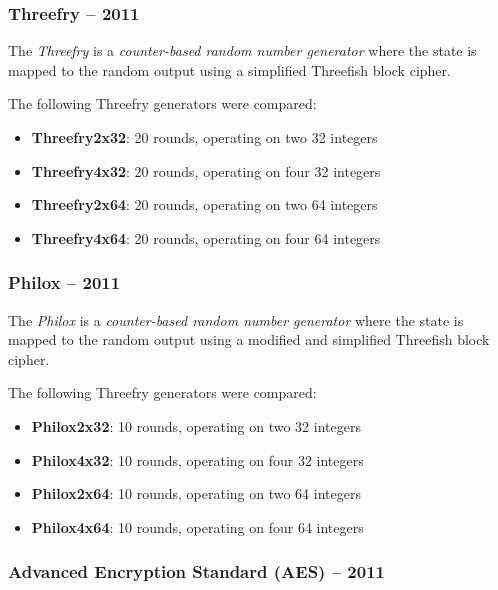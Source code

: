 \subsubsection[Threefry -- 2011]{Threefry -- 2011} \label{subsubsec:threefry}

    The \emph{Threefry} is a \emph{counter-based random number generator} where the state is mapped to the random output using a simplified Threefish block cipher.

    The following Threefry generators were compared:
    \begin{itemize}
		\itemsep0em
        \item \textbf{Threefry2x32}: 20 rounds, operating on two  \SI{32}{\bit} integers
        \item \textbf{Threefry4x32}: 20 rounds, operating on four \SI{32}{\bit} integers
        \item \textbf{Threefry2x64}: 20 rounds, operating on two  \SI{64}{\bit} integers
        \item \textbf{Threefry4x64}: 20 rounds, operating on four \SI{64}{\bit} integers
    \end{itemize}

\subsubsection[Philox -- 2011]{Philox -- 2011} \label{subsubsec:philox}

    The \emph{Philox} is a \emph{counter-based random number generator} where the state is mapped to the random output using a modified and simplified Threefish block cipher.

    The following Threefry generators were compared:
    \begin{itemize}
		\itemsep0em
        \item \textbf{Philox2x32}: 10 rounds, operating on two  \SI{32}{\bit} integers
        \item \textbf{Philox4x32}: 10 rounds, operating on four \SI{32}{\bit} integers
        \item \textbf{Philox2x64}: 10 rounds, operating on two  \SI{64}{\bit} integers
        \item \textbf{Philox4x64}: 10 rounds, operating on four \SI{64}{\bit} integers
    \end{itemize}

\subsubsection[Advanced Encryption Standard (AES) -- 2011]{Advanced Encryption Standard (AES) -- 2011} \label{subsubsec:aes}

